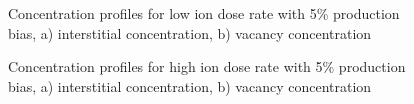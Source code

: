 \documentclass[a4paper]{article}
\begin{document}
\begin{figure}[h!]
        \caption{Concentration profiles for low ion dose rate with 5\% production bias, a) interstitial concentration, b) vacancy concentration}
        \label{figure:concentrations_ion_5_1e-6}
      \end{figure}
      \begin{figure}[h!]  %
        \centering
        \qquad
        \caption{Concentration profiles for high ion dose rate with 5\% production bias, a) interstitial concentration, b) vacancy concentration}
        \label{figure:concentrations_ion_5_1e-3}
      \end{figure}
\end{document}
